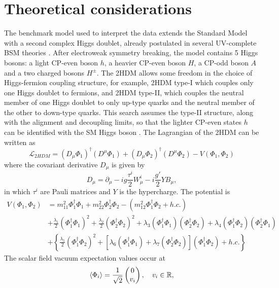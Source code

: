 \section{Theoretical considerations}
\label{sect:theoretical-considerations-2hdma}
The benchmark model used to interpret the data extends the Standard Model with a second complex Higgs doublet, already postulated in several UV-complete BSM theories \cite{Buckley:2014fba,Abercrombie:2015wmb}. After electroweak symmetry breaking, the model contains 5 Higgs bosons: a light CP-even boson $h$, a heavier CP-even boson $H$, a CP-odd boson $A$ and a two charged bosons $H^{\pm}$. The 2HDM allows some freedom in the choice of Higgs-fermion coupling structure, for example, 2HDM type-I which couples only one Higgs doublet to fermions, and 2HDM type-II, which couples the neutral member of one Higgs doublet to only up-type quarks and the neutral member of the other to down-type quarks. This search assumes the type-II structure, along with the alignment and decoupling limits, so that the lighter CP-even states $h$ can be identified with the SM Higgs boson \cite{Gunion:2002zf}. The Lagrangian of the 2HDM can be written as 
\begin{equation}
    \label{4.1}
    \mathcal{L}_{2HDM} = (D_{\mu}\Phi_1)^{\dag}(D^{\mu}\Phi_1) + (D_{\mu}\Phi_2)^{\dag}(D^{\mu}\Phi_2) - V(\Phi_1, \Phi_2)
\end{equation}
where the covariant derivative $D_{\mu}$ is given by 
$$D_{\mu} = \partial_{\mu} - ig\frac{\tau^i}{2}W^i_{\mu} - i\frac{g'}{2}YB_{\mu},$$
in which $\tau^i$ are Pauli matrices and $Y$ is the hypercharge. The potential is
\begin{equation} \label{4.2}
    \begin{split} 
        V(\Phi_1, \Phi_2)  &= m_{11}^2\Phi_1^{\dag}\Phi_1 + m_{22}^2\Phi_2^{\dag}\Phi_2 - (m_{12}^2 \Phi_1^{\dag}\Phi_2 + h.c.) \\
        &+ \frac{\lambda_1}{2}(\Phi_1^{\dag}\Phi_1)^2 + \frac{\lambda_2}{2}(\Phi_2^{\dag}\Phi_2)^2  
        + \lambda_3(\Phi_1^{\dag}\Phi_1)(\Phi_2^{\dag}\Phi_2) + \lambda_4 (\Phi_1^{\dag}\Phi_2)(\Phi_2^{\dag}\Phi_1) \\ 
        &+ \left\{ \frac{\lambda_5}{2} (\Phi_1^{\dag}\Phi_2)^2 + [\lambda_6(\Phi_1^{\dag}\Phi_1) + \lambda_7(\Phi_2^{\dag}\Phi_2) ](\Phi_1^{\dag}\Phi_2) + h.c. \right\} 
    \end{split}
\end{equation}
The scalar field vacuum expectation values occur at 
\begin{equation}
    \label{4.3}
    \expval{\Phi_i} = \frac{1}{\sqrt{2}}\begin{pmatrix}
        0 \\ v_i
    \end{pmatrix},\quad v_i \in \mathbb{R},
\end{equation}
